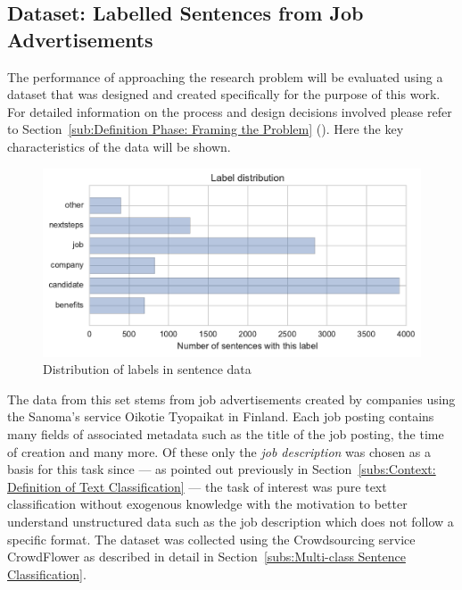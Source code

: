 \subsection{Dataset: Labelled Sentences from Job Advertisements}
\label{subs:Dataset: Labelled Sentences from Job Advertisements}

The performance of approaching the research problem will be evaluated using a dataset that was designed and created specifically for the purpose of this work. For detailed information on the process and design decisions involved please refer to Section~\ref{sub:Definition Phase: Framing the Problem} (). Here the key characteristics of the data will be shown.

\begin{figure}[h]
    \centering
    \includegraphics[width=\textwidth]{img/sentence-data-label-dist.pdf}
    \caption{Distribution of labels in sentence data}
\label{fig:sentence-data-label-dist}
\end{figure}

The data from this set stems from job advertisements created by companies using the \gls{Sanoma}'s service \gls{Oikotie Tyopaikat} in Finland. Each job posting contains many fields of associated metadata such as the title of the job posting, the time of creation and many more. Of these only the \emph{job description} was chosen as a basis for this task since --- as pointed out previously in Section~\ref{subs:Context: Definition of Text Classification} --- the task of interest was pure text classification without exogenous knowledge with the motivation to better understand unstructured data such as the job description which does not follow a specific format. The dataset was collected using the \gls{Crowdsourcing} service \gls{CrowdFlower} as described in detail in Section~\ref{subs:Multi-class Sentence Classification}.

